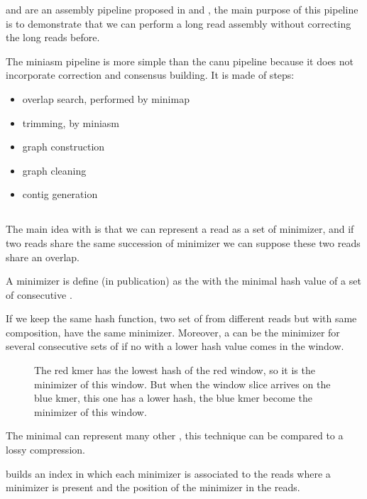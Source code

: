\documentclass[main]{subfiles}
\begin{document}
\minimap and \miniasm are an assembly pipeline proposed in \cite{miniasm_minimap} and \cite{minimap2}, the main purpose of this pipeline is to demonstrate that we can perform a long read assembly without correcting the long reads before.

The miniasm pipeline is more simple than the canu pipeline because it does not incorporate correction and consensus building. It is made of steps:
\begin{itemize}
    \item overlap search, performed by minimap
    \item trimming, by miniasm
    \item graph construction 
    \item graph cleaning
    \item contig generation
\end{itemize}


\subsection{\minimap} \label{subsec:sota:miniasm:minimap}

The main idea with \minimap is that we can represent a read as a set of minimizer, and if two reads share the same succession of minimizer we can suppose these two reads share an overlap.

A minimizer is define (in \minimap publication) as the \kmer with the minimal hash value of a set of consecutive \kmer.

If we keep the same hash function, two set of \kmer from different reads but with same \kmer composition, have the same \kmer minimizer.
Moreover, a \kmer can be the minimizer for several consecutive sets of \kmer if no \kmer with a lower hash value comes in the window. 

\begin{figure}[ht]
    \centering
    
    \caption{The red kmer has the lowest hash of the red window, so it is the minimizer of this window. But when the window slice arrives on the blue kmer, this one has a lower hash, the blue kmer become the minimizer of this window.}
    \label{sota:fig:miniasm:minimizer}
\end{figure}

The minimal \kmer can represent many other \kmer, this technique can be compared to a lossy compression.

\minimap builds an index in which each minimizer is associated to the reads where a minimizer is present and the position of the minimizer in the reads.
\end{document}
